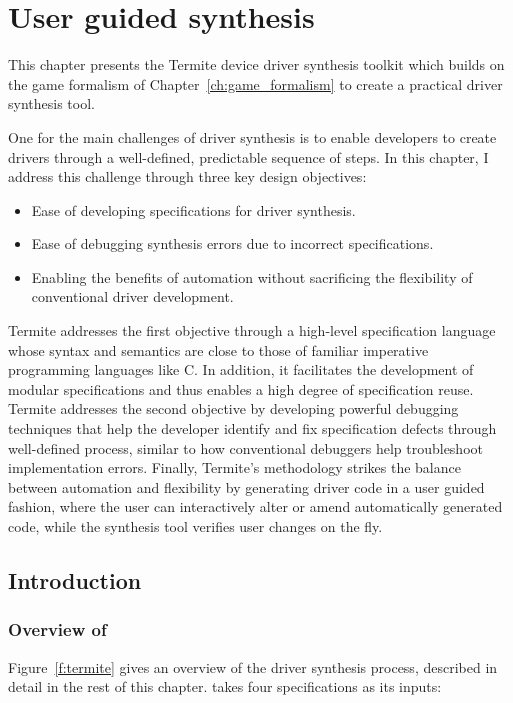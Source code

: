 \chapter{User guided synthesis}
\label{ch:userguided}

This chapter presents the Termite device driver synthesis toolkit which builds on the game formalism of Chapter~\ref{ch:game_formalism} to create a practical driver synthesis tool.

One for the main challenges of driver synthesis is to enable developers to create drivers through a well-defined, predictable sequence of steps. In this chapter, I address this challenge through three key design objectives:
\begin{itemize}
    \item Ease of developing specifications for driver synthesis.
    \item Ease of debugging synthesis errors due to incorrect specifications.
    \item Enabling the benefits of automation without sacrificing the flexibility of conventional driver development.  
\end{itemize}
    
Termite addresses the first objective through a high-level specification language whose syntax and semantics are close to those of familiar imperative programming languages like C.  In addition, it facilitates the development of modular specifications and thus enables a high degree of specification reuse. Termite addresses the second objective by developing powerful debugging techniques that help the developer identify and fix specification defects through well-defined process, similar to how conventional debuggers help troubleshoot implementation errors.  Finally, Termite's methodology strikes the balance between automation and flexibility by generating driver code in a user guided fashion, where the user can interactively alter or amend automatically generated code, while the synthesis tool verifies user changes on the fly.

\section{Introduction}\label{sec:user_guided_intro}

\subsection{Overview of \termite} Figure~\ref{f:termite} gives an overview of the driver synthesis process, described in detail in the rest of this chapter.  \termite takes four specifications as its inputs: 

